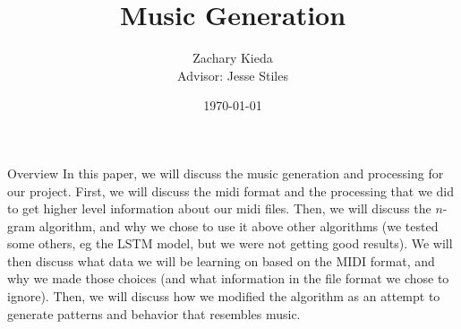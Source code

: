 \documentclass[11pt]{article}
\title{Music Generation}
\author{Zachary Kieda\\{Advisor: Jesse Stiles}}
\date{\today}
\begin{document}
\maketitle
\begin{section}{Overview}
In this paper, we will discuss the music generation and processing for our project. First, we will discuss the midi format and the processing that we did to get higher level information about our midi files. Then, we will discuss the $n$-gram algorithm, and why we chose to use it above other algorithms (we tested some others, eg the LSTM model, but we were not getting good results). We will then discuss what data we will be learning on based on the MIDI format, and why we made those choices (and what information in the file format we chose to ignore). Then, we will discuss how we modified the algorithm as an attempt to generate patterns and behavior that resembles music. 
\end{section}
\end{document}

